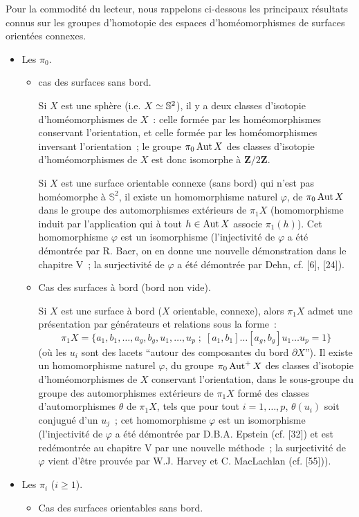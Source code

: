 Pour la commodité du lecteur, nous rappelons ci-dessous les principaux résultats connus sur les groupes d'homotopie des espaces d'homéomorphismes de surfaces orientées connexes.
\begin{itemize}
    \item[$1^\circ$)] Les $\pi_0$.
    \begin{itemize}
        \item[a)] cas des surfaces sans bord.

        Si $X$ est une sphère (i.e. $X \simeq \mathbb{S}^2$), il y a deux classes d'isotopie d'homéomorphismes de $X$~: celle formée par les homéomorphismes conservant l'orientation, et celle formée par les homéomorphismes inversant l'orientation~; le groupe $\pi_0 \operatorname{Aut} X$ des classes d'isotopie d'homéomorphismes de $X$ est donc isomorphe à $\mathbf{Z}/2\mathbf{Z}$.

        Si $X$ est une surface orientable connexe (sans bord) qui n'est pas homéomorphe à $\mathbb{S}^2$, il existe un homomorphisme naturel $\varphi$, de $\pi_0 \operatorname{Aut} X$ dans le groupe des automorphismes extérieurs de $\pi_1 X$ (homomorphisme induit par l'application qui à tout $h \in \operatorname{Aut} X$ associe $\pi_1(h)$). Cet homomorphisme $\varphi$ est un isomorphisme (l'injectivité de $\varphi$ a été démontrée par R. Baer, on en donne une nouvelle démonstration dans le chapitre V~; la surjectivité de $\varphi$ a été démontrée par Dehn, cf. [6], [24]).
        \item[b)] Cas des surfaces à bord (bord non vide).

        Si $X$ est une surface à bord ($X$ orientable, connexe), alors $\pi_1 X$ admet une présentation par générateurs et relations sous la forme~: 
        $$
        \pi_1 X = \{a_1, b_1, \dots, a_g, b_g, u_1, \dots, u_p \;;\; [a_1, b_1] \dots [a_g, b_g] u_1 \dots u_p = 1\}
        $$ 
        (où les $u_i$ sont des lacets ``autour des composantes du bord $\partial X$''). Il existe un homomorphisme naturel $\varphi$, du groupe $\pi_0 \operatorname{Aut}^+ X$ des classes d'isotopie d'homéomorphismes de $X$ conservant l'orientation, dans le sous-groupe du groupe des automorphismes extérieurs de $\pi_1 X$ formé des classes d'automorphismes $\theta$ de $\pi_1 X$, tels que pour tout $i = 1, \dots, p$, $\theta(u_i)$ soit conjugué d'un $u_j$~; cet homomorphisme $\varphi$ est un isomorphisme (l'injectivité de $\varphi$ a été démontrée par D.B.A. Epstein (cf. [32]) et est redémontrée au chapitre V par une nouvelle méthode~; la surjectivité de $\varphi$ vient d'être prouvée par W.J. Harvey et C. MacLachlan (cf. [55])).
    \end{itemize}
    \item[$2^\circ$)] Les $\pi_i$ ($i \ge 1$).
    \begin{itemize}
        \item[a)] Cas des surfaces orientables sans bord.


\end{itemize}
\end{itemize}
